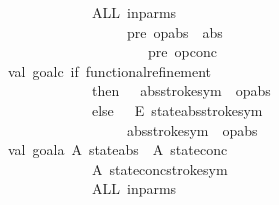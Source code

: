 \begin{isabellebody}
\ \ \ \ \ \ \ \ \ \ \ \ \ \ \ \ \ \ \ \ \ \ \ {\isacharparenleft}ALL\ in{\isacharunderscore}parms\ \ \ \ \ \ \ \ \ \ \ \ \ \ \ \ \ \ \ \ \ \ \ \isanewline
\ \ \ \ \ \ \ \ \ \ \ \ \ \ \ \ \ \ \ \ \ \ \ \ \ \ \ \ {\isacharparenleft}{\isachardoublequote}pre\ {\isachardoublequote}{\isacharcircum}op{\isacharunderscore}abs{\isacharcircum}{\isachardoublequote}\ {\isasymand}\ {\isachardoublequote}{\isacharcircum}abs{\isacharcircum}\isanewline
\ \ \ \ \ \ \ \ \ \ \ \ \ \ \ \ \ \ \ \ \ \ \ \ \ \ \ \ \ {\isachardoublequote}\ {\isasymlongrightarrow}\ pre\ {\isachardoublequote}{\isacharcircum}op{\isacharunderscore}conc{\isacharparenright}{\isacharparenright}{\isacharcircum}{\isachardoublequote}{\isacharparenright}{\isachardoublequote}\isanewline
\ \ \ \ \ \ \ \ \ \ \ val\ goal{}c{\isacharequal}\ if\ functional{\isacharunderscore}refinement\ \isanewline
\ \ \ \ \ \ \ \ \ \ \ \ \ \ \ \ \ \ \ \ \ \ \ then\ {\isachardoublequote}\ {\isasymand}\ {\isachardoublequote}{\isacharcircum}abs{\isacharcircum}stroke{\isacharunderscore}sym{\isacharcircum}{\isachardoublequote}\ {\isasymlongrightarrow}\ {\isachardoublequote}{\isacharcircum}op{\isacharunderscore}abs\isanewline
\ \ \ \ \ \ \ \ \ \ \ \ \ \ \ \ \ \ \ \ \ \ \ else\ {\isachardoublequote}\ {\isasymlongrightarrow}\ {\isacharparenleft}{\isacharpercent}E\ {\isachardoublequote}{\isacharcircum}state{\isacharunderscore}abs{\isacharcircum}stroke{\isacharunderscore}sym{\isacharcircum}{\isachardoublequote}\ {\isacharat}\ {\isachardoublequote}\isanewline
\ \ \ \ \ \ \ \ \ \ \ \ \ \ \ \ \ \ \ \ \ \ \ \ \ \ \ \ {\isacharcircum}abs{\isacharcircum}stroke{\isacharunderscore}sym{\isacharcircum}{\isachardoublequote}\ {\isasymand}\ {\isachardoublequote}{\isacharcircum}op{\isacharunderscore}abs{\isacharcircum}{\isachardoublequote}{\isacharparenright}{\isachardoublequote}\isanewline
\ \ \ \ \ \ \ \ \ \ \ val\ goal{}a{\isacharequal}\ {\isachardoublequote}{\isacharpercent}A\ {\isachardoublequote}{\isacharcircum}state{\isacharunderscore}abs{\isacharcircum}{\isachardoublequote}\ {\isacharat}\ {\isacharparenleft}{\isacharpercent}A\ {\isachardoublequote}{\isacharcircum}state{\isacharunderscore}conc{\isacharcircum}{\isachardoublequote}\ {\isacharat}\ {\isachardoublequote}{\isacharcircum}\isanewline
\ \ \ \ \ \ \ \ \ \ \ \ \ \ \ \ \ \ \ \ \ \ \ {\isachardoublequote}{\isacharparenleft}{\isacharpercent}A\ {\isachardoublequote}{\isacharcircum}state{\isacharunderscore}conc{\isacharcircum}stroke{\isacharunderscore}sym{\isacharcircum}{\isachardoublequote}\ {\isacharat}\ {\isachardoublequote}{\isacharcircum}\isanewline
\ \ \ \ \ \ \ \ \ \ \ \ \ \ \ \ \ \ \ \ \ \ \ {\isacharparenleft}ALL\ in{\isacharunderscore}parms\ \ \ \ \ \ \ \ \ \ \ \ \ \ \ \ \ \ \ \ \ \ \ \isanewline

\end{isabellebody}
